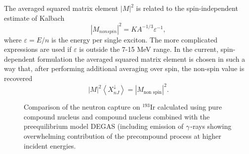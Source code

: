 The averaged squared matrix element $|M|^{2}$ is related to the
spin-independent estimate of Kalbach \cite{Kalbach}
\begin{equation}
|M_{nonspin}|^{2}=KA^{-1/3}\varepsilon ^{-1},
\end{equation}%
\noindent where $\varepsilon =E/n$ is the energy per single exciton. The
more complicated expressions \cite{Kalbach} are used if $\varepsilon $ is
outside the 7-15 MeV range. In the current, spin-dependent formulation the
averaged squared matrix element is chosen in such a way that, after
performing additional averaging over spin, the non-spin value is recovered
\begin{equation}
|M|^{2}\left\langle X_{nJ}^{\downarrow }\right\rangle =|M_{\text{non spin}%
}|^{2}.
\end{equation}%
\begin{figure}[tbph]
\caption{Comparison of the neutron capture on $^{193}$Ir calculated using
pure compound nucleus and compound nucleus combined with the preequilibrium
model DEGAS (including emission of $\protect\gamma $-rays showing
overwhelming contribution of the precompound process at higher incident
energies. }
\label{ir193}
\end{figure}

